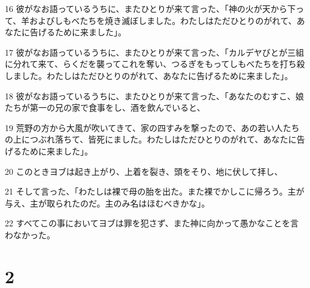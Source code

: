 \par 16 彼がなお語っているうちに、またひとりが来て言った、「神の火が天から下って、羊およびしもべたちを焼き滅ぼしました。わたしはただひとりのがれて、あなたに告げるために来ました」。
\par 17 彼がなお語っているうちに、またひとりが来て言った、「カルデヤびとが三組に分れて来て、らくだを襲ってこれを奪い、つるぎをもってしもべたちを打ち殺しました。わたしはただひとりのがれて、あなたに告げるために来ました」。
\par 18 彼がなお語っているうちに、またひとりが来て言った、「あなたのむすこ、娘たちが第一の兄の家で食事をし、酒を飲んでいると、
\par 19 荒野の方から大風が吹いてきて、家の四すみを撃ったので、あの若い人たちの上につぶれ落ちて、皆死にました。わたしはただひとりのがれて、あなたに告げるために来ました」。
\par 20 このときヨブは起き上がり、上着を裂き、頭をそり、地に伏して拝し、
\par 21 そして言った、「わたしは裸で母の胎を出た。また裸でかしこに帰ろう。主が与え、主が取られたのだ。主のみ名はほむべきかな」。
\par 22 すべてこの事においてヨブは罪を犯さず、また神に向かって愚かなことを言わなかった。

\chapter{2}

